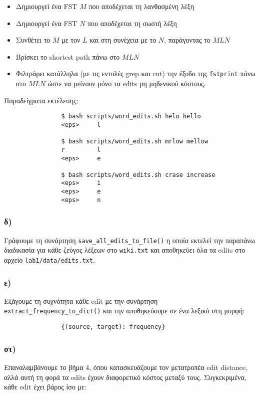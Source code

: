 \documentclass[a4paper, 12pt]{article}
\begin{document}
        	\begin{itemize}
        		\item Δημιουργεί ένα FST $M$ που αποδέχεται τη λανθασμένη λέξη 
        		\item Δημιουργεί ένα FST $N$ που αποδέχεται τη σωστή λέξη
        		\item Συνθέτει το $M$ με τον $L$ και στη συνέχεια με το $N$, παράγοντας το $MLN$
        		\item Βρίσκει το shortest path πάνω στο $MLN$
        		\item Φιλτράρει κατάλληλα (με τις εντολές grep και cut) την έξοδο της \verb|fstprint| πάνω στο $MLN$ ώστε να μείνουν μόνο τα edits μη μηδενικού κόστους.
        	\end{itemize}
        	
        	Παραδείγματα εκτέλεσης:
        	
        	\begin{verbatim}
        		$ bash scripts/word_edits.sh helo hello
        		<eps>     l
        		
        		$ bash scripts/word_edits.sh mrlow mellow
        		r         l 
        		<eps>     e
        		
        		$ bash scripts/word_edits.sh crase increase
        		<eps>     i 
        		<eps>     e
        		<eps>     n
        	\end{verbatim}
        
        \subsubsection*{δ)}
        	Γράφουμε τη συνάρτηση \verb|save_all_edits_to_file()| η οποία εκτελεί την παραπάνω διαδικασία για κάθε ζεύγος λέξεων στο \verb|wiki.txt| και αποθηκεύει όλα τα edits στο αρχείο \verb|lab1/data/edits.txt|.
        	
        \subsubsection*{ε)}   
        	Εξάγουμε τη συχνότητα κάθε edit με την συνάρτηση \verb|extract_frequency_to_dict()| και την αποθηκεύουμε σε ένα λεξικό στη μορφή:
        	
        	\begin{verbatim}
				{(source, target): frequency}
        	\end{verbatim}
        
        \subsubsection*{στ)}   
        	Επαναλαμβάνουμε το βήμα 4, όπου κατασκευάζουμε τον μετατροπέα edit distance, αλλά αυτή τη φορά τα edits έχουν διαφορετικό κόστος μεταξύ τους. Συγκεκριμένα, κάθε edit έχει βάρος ίσο με:
        	
\end{document}
